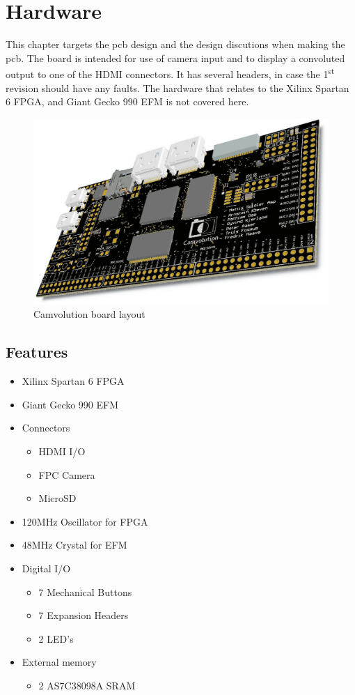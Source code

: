 \section{Hardware}
This chapter targets the pcb design and the design discutions when making the pcb.
The board is intended for use of camera input and to display a convoluted output to one of the HDMI connectors.
It has several headers, in case the 1\textsuperscript{st} revision should have any faults.
The hardware that relates to the Xilinx Spartan 6 FPGA, and Giant Gecko 990 EFM is not covered here.

\begin{figure}
    \includegraphics[width=\linewidth]{img/OverviewCamvolutionKit}
    \caption{Camvolution board layout}
\end{figure}

\subsection{Features}
\begin{itemize}
    \item Xilinx Spartan 6 FPGA
    \item Giant Gecko 990 EFM
    \item Connectors
        \begin{itemize}
            \item HDMI I/O
            \item FPC Camera
            \item MicroSD
        \end{itemize}
    \item 120MHz Oscillator for FPGA
    \item 48MHz Crystal for EFM
    \item Digital I/O
        \begin{itemize}
            \item 7 Mechanical Buttons
            \item 7 Expansion Headers
            \item 2 LED's
        \end{itemize}
    \item External memory
        \begin{itemize}
            \item 2 AS7C38098A SRAM
        \end{itemize}
\end{itemize}

